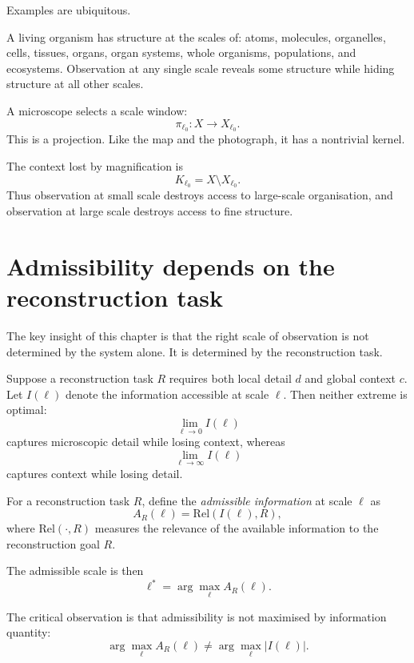 Examples are ubiquitous.

\begin{example}
  A living organism has structure at the scales of:
  atoms, molecules, organelles, cells, tissues, organs,
  organ systems, whole organisms, populations, and ecosystems.
  Observation at any single scale reveals some structure while
  hiding structure at all other scales.
\end{example}

A microscope selects a scale window:
\[
  \pi_{\ell_0} : X \to X_{\ell_0}.
\]
This is a projection.
Like the map and the photograph, it has a nontrivial kernel.

The context lost by magnification is
\[
  K_{\ell_0} = X \setminus X_{\ell_0}.
\]
Thus observation at small scale destroys access to large-scale
organisation, and observation at large scale destroys access to
fine structure.

\section{Admissibility depends on the reconstruction task}

The key insight of this chapter is that the right scale of
observation is not determined by the system alone.
It is determined by the reconstruction task.

Suppose a reconstruction task $R$ requires both local detail
$d$ and global context $c$.
Let $I(\ell)$ denote the information accessible at scale $\ell$.
Then neither extreme is optimal:
\[
  \lim_{\ell \to 0} I(\ell)
\]
captures microscopic detail while losing context, whereas
\[
  \lim_{\ell \to \infty} I(\ell)
\]
captures context while losing detail.

\begin{definition}
  For a reconstruction task $R$, define the
  \emph{admissible information} at scale $\ell$ as
  \[
    A_R(\ell) = \mathrm{Rel}(I(\ell), R),
  \]
  where $\mathrm{Rel}(\cdot, R)$ measures the relevance of the
  available information to the reconstruction goal $R$.
\end{definition}

The admissible scale is then
\[
  \ell^* = \arg\max_\ell A_R(\ell).
\]

The critical observation is that admissibility is not
maximised by information quantity:
\[
  \arg\max_\ell A_R(\ell)
  \neq
  \arg\max_\ell |I(\ell)|.
\]

